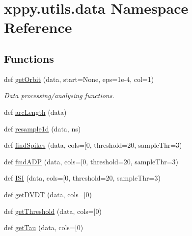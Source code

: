 \hypertarget{namespacexppy_1_1utils_1_1data}{}\section{xppy.\+utils.\+data Namespace Reference}
\label{namespacexppy_1_1utils_1_1data}
\subsection*{Functions}
\begin{DoxyCompactItemize}
\item 
def \mbox{\hyperlink{namespacexppy_1_1utils_1_1data_a5b590b344df5f227497a0be2c46d7182}{get\+Orbit}} (data, start=None, eps=1e-\/4, col=1)
\begin{DoxyCompactList}\small\item\em Data processing/analysing functions. \end{DoxyCompactList}\item 
def \mbox{\hyperlink{namespacexppy_1_1utils_1_1data_a380d774ab7acaada36d1e3885dff4def}{arc\+Length}} (data)
\item 
def \mbox{\hyperlink{namespacexppy_1_1utils_1_1data_a7306f92ed3b5678b74bd4e0fa75ddb6e}{resample1d}} (data, ns)
\item 
def \mbox{\hyperlink{namespacexppy_1_1utils_1_1data_ab759be682464d135b9aff86a1ed5b5bf}{find\+Spikes}} (data, cols=\mbox{[}0, threshold=20, sample\+Thr=3)
\item 
def \mbox{\hyperlink{namespacexppy_1_1utils_1_1data_a585f17a25e7dcefc06dd2476644fed6a}{find\+A\+DP}} (data, cols=\mbox{[}0, threshold=20, sample\+Thr=3)
\item 
def \mbox{\hyperlink{namespacexppy_1_1utils_1_1data_a106565881aecee459e3af1b3b2778731}{I\+SI}} (data, cols=\mbox{[}0, threshold=20, sample\+Thr=3)
\item 
def \mbox{\hyperlink{namespacexppy_1_1utils_1_1data_aeab79029ca4d8b88427aef50e2b7ead1}{get\+D\+V\+DT}} (data, cols=\mbox{[}0)
\item 
def \mbox{\hyperlink{namespacexppy_1_1utils_1_1data_a813c03dadd59868d94ee0ad6039848a3}{get\+Threshold}} (data, cols=\mbox{[}0)
\item 
def \mbox{\hyperlink{namespacexppy_1_1utils_1_1data_a3bace94f47f9cadb95abf59e90a272dd}{get\+Tau}} (data, cols=\mbox{[}0)
\end{DoxyCompactItemize}


